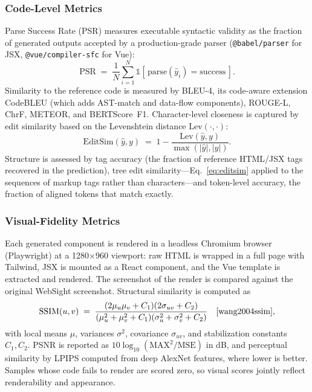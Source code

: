 \subsubsection{Code-Level Metrics}
Parse Success Rate (PSR) measures executable syntactic validity as the
fraction of generated outputs accepted by a production-grade parser
(\texttt{@babel/parser} for JSX, \texttt{@vue/compiler-sfc} for Vue):
\begin{equation}
\mathrm{PSR} \;=\; \frac{1}{N} \sum_{i=1}^{N}
\mathbb{1}\!\left[\,\mathrm{parse}(\hat{y}_i) = \text{success}\,\right].
\label{eq:psr}
\end{equation}
Similarity to the reference code is measured by BLEU-4, its code-aware
extension CodeBLEU (which adds AST-match and data-flow components), ROUGE-L,
ChrF, METEOR, and BERTScore~F1. Character-level closeness is captured by edit
similarity based on the Levenshtein distance $\mathrm{Lev}(\cdot,\cdot)$:
\begin{equation}
\mathrm{EditSim}(\hat{y}, y) \;=\;
1 - \frac{\mathrm{Lev}(\hat{y}, y)}{\max\!\left(|\hat{y}|, |y|\right)} .
\label{eq:editsim}
\end{equation}
Structure is assessed by tag accuracy (the fraction of reference HTML/JSX tags
recovered in the prediction), tree edit similarity---Eq.~\eqref{eq:editsim}
applied to the sequences of markup tags rather than characters---and
token-level accuracy, the fraction of aligned tokens that match exactly.

\subsubsection{Visual-Fidelity Metrics}
Each generated component is rendered in a headless Chromium browser
(Playwright) at a 1280$\times$960 viewport: raw HTML is wrapped in a full page
with Tailwind, JSX is mounted as a React component, and the Vue template is
extracted and rendered. The screenshot of the render is compared against the
original WebSight screenshot. Structural similarity is computed as
\begin{equation}
\mathrm{SSIM}(u,v) \;=\;
\frac{(2\mu_u \mu_v + C_1)(2\sigma_{uv} + C_2)}
     {(\mu_u^2 + \mu_v^2 + C_1)(\sigma_u^2 + \sigma_v^2 + C_2)}
\quad \cite{wang2004ssim},
\label{eq:ssim}
\end{equation}
with local means $\mu$, variances $\sigma^2$, covariance $\sigma_{uv}$, and
stabilization constants $C_1, C_2$. PSNR is reported as
$10\log_{10}(\mathrm{MAX}^2/\mathrm{MSE})$ in dB, and perceptual similarity by
LPIPS computed from deep AlexNet features, where lower is better. Samples whose
code fails to render are scored zero, so visual scores jointly reflect
renderability and appearance.

